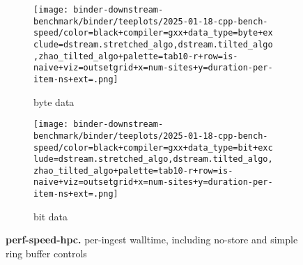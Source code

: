 \begin{figure*}

\begin{subfigure}{0.28\textwidth}
\centering
\texttt{[image: binder-downstream-benchmark/binder/teeplots/2025-01-18-cpp-bench-speed/color=black+compiler=gxx+data\_type=byte+exclude=dstream.stretched\_algo,dstream.tilted\_algo,zhao\_tilted\_algo+palette=tab10-r+row=is-naive+viz=outsetgrid+x=num-sites+y=duration-per-item-ns+ext=.png]}
\caption{byte data}
\label{fig:perf-speed-hpc:byte}
\end{subfigure}%
\begin{subfigure}{0.72\textwidth}
\texttt{[image: binder-downstream-benchmark/binder/teeplots/2025-01-18-cpp-bench-speed/color=black+compiler=gxx+data\_type=bit+exclude=dstream.stretched\_algo,dstream.tilted\_algo,zhao\_tilted\_algo+palette=tab10-r+row=is-naive+viz=outsetgrid+x=num-sites+y=duration-per-item-ns+ext=.png]}
\centering
\caption{bit data}
\label{fig:perf-speed-hpc:bit}
\end{subfigure}

\caption{
\textbf{perf-speed-hpc.}
\footnotesize
per-ingest walltime, including no-store and simple ring buffer controls
}
\label{fig:perf-speed-hpc}
\end{figure*}
